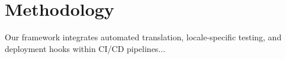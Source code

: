 \section{Methodology}
Our framework integrates automated translation, locale-specific testing, and deployment hooks within CI/CD pipelines... 
